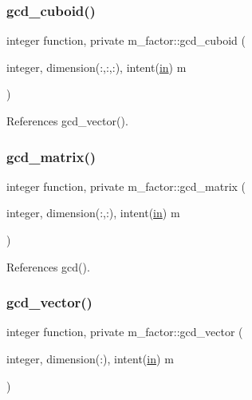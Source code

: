 \mbox{\label{namespacem__factor_aff0e6f81edd8efc0fe41822916fb4efa}} 
\subsubsection{\texorpdfstring{gcd\+\_\+cuboid()}{gcd\_cuboid()}}
{\footnotesize\ttfamily integer function, private m\+\_\+factor\+::gcd\+\_\+cuboid (\begin{DoxyParamCaption}\item[{integer, dimension(\+:,\+:,\+:), intent(\hyperlink{M__journal_83_8txt_afce72651d1eed785a2132bee863b2f38}{in})}]{m }\end{DoxyParamCaption})\hspace{0.3cm}{\ttfamily [private]}}



References gcd\+\_\+vector().

\mbox{\label{namespacem__factor_a6edfef428cb51a2cbe97cfb0ad25da8b}} 
\subsubsection{\texorpdfstring{gcd\+\_\+matrix()}{gcd\_matrix()}}
{\footnotesize\ttfamily integer function, private m\+\_\+factor\+::gcd\+\_\+matrix (\begin{DoxyParamCaption}\item[{integer, dimension(\+:,\+:), intent(\hyperlink{M__journal_83_8txt_afce72651d1eed785a2132bee863b2f38}{in})}]{m }\end{DoxyParamCaption})\hspace{0.3cm}{\ttfamily [private]}}



References gcd().

\mbox{\label{namespacem__factor_a60713d4c44895b4c18d4d6d9449ceaf7}} 
\subsubsection{\texorpdfstring{gcd\+\_\+vector()}{gcd\_vector()}}
{\footnotesize\ttfamily integer function, private m\+\_\+factor\+::gcd\+\_\+vector (\begin{DoxyParamCaption}\item[{integer, dimension(\+:), intent(\hyperlink{M__journal_83_8txt_afce72651d1eed785a2132bee863b2f38}{in})}]{m }\end{DoxyParamCaption})\hspace{0.3cm}{\ttfamily [private]}}



